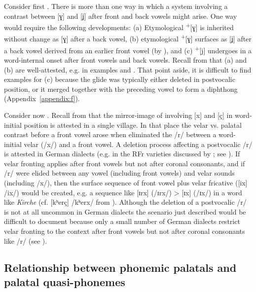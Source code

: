 Consider first . There is more than one way in which a system involving a contrast between [ɣ] and [ʝ] after front and back vowels might arise. One way would require the following developments: (a) Etymological \textsuperscript{+}[ɣ] is inherited without change as [ɣ] after a back vowel, (b) etymological \textsuperscript{+}[ɣ] surfaces as [ʝ] after a back vowel derived from an earlier front vowel (by ), and (c)  \textsuperscript{+}[j] undergoes  in a word-internal onset after front vowels and back vowels. Recall from  that (a) and (b) are well-attested, e.g. in  examples  and . That point aside, it is difficult to find examples for (c) because the  glide was typically either deleted in postvocalic position, or it merged together with the preceding vowel to form a diphthong (Appendix~\ref{appendix:f}).

Consider now . Recall from  that the mirror-image of  involving [x] and [ç] in word-initial position is attested in a single village. In that place the velar vs. palatal contrast before a front vowel arose when  eliminated the /r/ between a word-initial velar (/x/) and a front vowel. A deletion process affecting a postvocalic /r/ is attested in German dialects (e.g. in the RFr varieties discussed by \citealt{Karch1981}; see ). If velar fronting applies after front vowels but not after coronal consonants, and if /r/ were elided between any vowel (including front vowels) and velar sounds (including /x/), then the surface sequence of front vowel plus velar fricative ([ix] /ix/) would be created, e.g. a sequence like [ɪrx] (/ɪrx/) > [ɪx] (/ɪx/) in a word like \textit{Kirche} (cf.  [kʰerç] /kʰerx/ from ). Although the deletion of a postvocalic /r/ is not at all uncommon in German dialects the scenario just described would be difficult to document because only a small number of German dialects restrict velar fronting to the context after front vowels but not after coronal consonants like /r/ (see ).

\subsection{Relationship between phonemic palatals and palatal quasi-phonemes}\label{sec:9.4.2}

